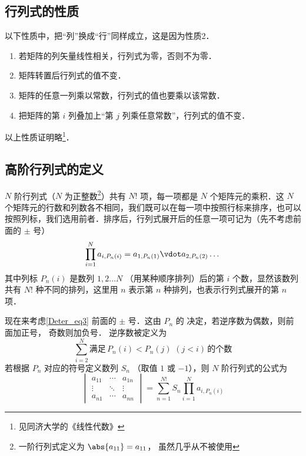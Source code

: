 \subsection{行列式的性质}
以下性质中，把“列”换成“行”同样成立，这是因为性质2．
\begin{enumerate}
\item 若矩阵的列矢量线性相关，行列式为零，否则不为零．
\item 矩阵转置后行列式的值不变． %
\item 矩阵的任意一列乘以常数，行列式的值也要乘以该常数．
\item 把矩阵的第 $i$ 列叠加上“第 $j$ 列乘任意常数”，行列式的值不变．

\end{enumerate}
以上性质证明略\footnote{见同济大学的《线性代数》}．

\subsection{高阶行列式的定义}
$N$ 阶行列式（$N$ 为正整数\footnote{一阶行列式定义为 $\abs{a_{11}}=a_{11}$， 虽然几乎从不被使用}）共有 $N!$ 项，每一项都是 $N$ 个矩阵元的乘积．这 $N$ 个矩阵元的行数和列数各不相同，我们既可以在每一项中按照行标来排序，也可以按照列标，我们选用前者．排序后，行列式展开后的任意一项可记为（先不考虑前面的 $\pm$ 号）
\begin{equation}\label{Deter_eq3}
\prod_{i=1}^N a_{i,P_n(i)} = 
a_{1,P_n(1)} \vdot a_{2,P_n(2)} \dots
\end{equation}
其中列标 ${P_n}(i)$ 是数列 $1,2 \dots N$ （用某种顺序排列）后的第 $i$ 个数，显然该数列共有 $N!$ 种不同的排列，这里用 $n$ 表示第 $n$ 种排列，也表示行列式展开的第 $n$ 项．

现在来考虑\autoref{Deter_eq3} 前面的 $\pm$ 号．这由 $P_n$ 的  决定，若逆序数为偶数，则前面加正号， 奇数则加负号． 逆序数被定义为
\begin{equation}
\sum_{i=2}^N \text{满足}\, P_n(i) < P_n(j) \,\, (j<i) \,\text{的个数} 
\end{equation}
若根据 $P_n$ 对应的符号定义数列 $S_n$ （取值 $1$ 或 $-1$），则 $N$ 阶行列式的公式为
\begin{equation}
\begin{vmatrix}
a_{11} & \cdots & a_{1n} \\
\vdots & \ddots & \vdots \\
a_{n1} & \cdots & a_{nn}
\end{vmatrix}
= \sum_{n=1}^{N!} S_n \prod_{i=1}^N a_{i,P_n(i)}
\end{equation}


